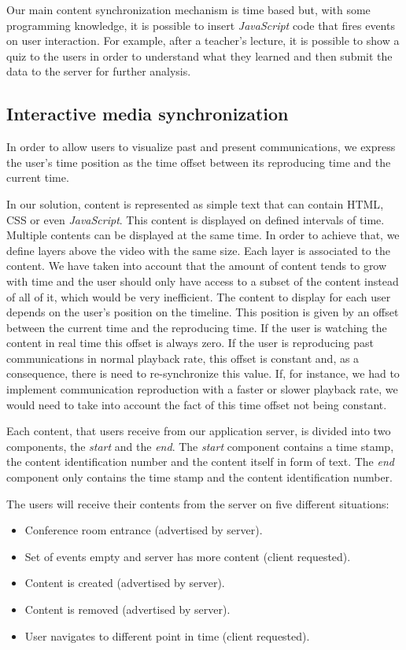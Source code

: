 	Our main content synchronization mechanism is time based but, with some programming knowledge, it is possible to insert \emph{JavaScript} code that fires events on user interaction. For example, after a teacher's lecture, it is possible to show a quiz to the users in order to understand what they learned and then submit the data to the server for further analysis.


	\subsection{Interactive media synchronization}

	In order to allow users to visualize past and present communications, we express the user's time position as the time offset between its reproducing time and the current time.


	In our solution, content is represented as simple text that can contain \ac{HTML}, \ac{CSS} or even \emph{JavaScript}. This content is displayed on defined intervals of time. Multiple contents can be displayed at the same time. In order to achieve that, we define layers above the video with the same size. Each layer is associated to the content.	We have taken into account that the amount of content tends to grow with time and the user should only have access to a subset of the content instead of all of it, which would be very inefficient. The content to display for each user depends on the user's position on the timeline. This position is given by an offset between the current time and the reproducing time. If the user is watching the content in real time this offset is always zero. If the user is reproducing past communications in normal playback rate, this offset is constant and, as a consequence, there is need to re-synchronize this value. If, for instance, we had to implement communication reproduction with a faster or slower playback rate, we would need to take into account the fact of this time offset not being constant. 

	Each content, that users receive from our application server, is divided into two components, the \emph{start} and the \emph{end}. The \emph{start} component contains a time stamp, the content identification number and the content itself in form of text. The \emph{end} component only contains the time stamp and the content identification number. 

	The users will receive their contents from the server on five different situations:

	\begin{itemize}
		\item Conference room entrance (advertised by server).
		\item Set of events empty and server has more content (client requested).
		\item Content is created (advertised by server).
		\item Content is removed (advertised by server).
		\item User navigates to different point in time (client requested).
	\end{itemize}

